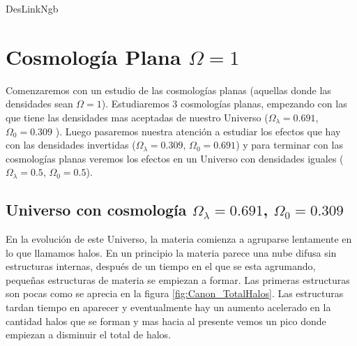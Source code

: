 DesLinkNgb
\section[Cosmología Plana \texorpdfstring{$\Omega = 1$}{Omega = 1}]{Cosmología Plana \texorpdfstring{$\Omega = 1$}{Omega = 1}}

\noindent Comenzaremos con un estudio de las cosmologías planas (aquellas donde las densidades sean $\Omega = 1$). Estudiaremos 3 cosmologías planas, empezando con las que tiene las densidades mas aceptadas de nuestro Universo ($\Omega_\lambda = 0.691$, $\Omega_0 = 0.309$  \cite{2020A&A...641A...1P}). Luego pasaremos nuestra atención a estudiar los efectos que hay con las densidades invertidas ($\Omega_\lambda = 0.309$, $\Omega_0 = 0.691$) y para terminar con las cosmologías planas veremos los efectos en un Universo con densidades iguales ($\Omega_\lambda = 0.5$, $\Omega_0 = 0.5$).

\subsection{Universo con cosmología  \texorpdfstring{$\Omega_\lambda = 0.691$, $\Omega_0 = 0.309$ }{Omega lambda = 0.691, Omega 0 = 0.309}  }

 En la evolución de este Universo, la materia comienza a agruparse lentamente en lo que llamamos halos. En un principio la materia parece una nube difusa sin estructuras internas, después de un tiempo en el que se esta agrumando, pequeñas estructuras de materia se empiezan a formar. Las primeras estructuras son pocas como se aprecia en la figura \ref{fig:Canon_TotalHalos}. Las estructuras tardan tiempo en aparecer y eventualmente hay un aumento acelerado en la cantidad halos que se forman y mas hacia al presente vemos un pico donde empiezan a disminuir el total de halos.

